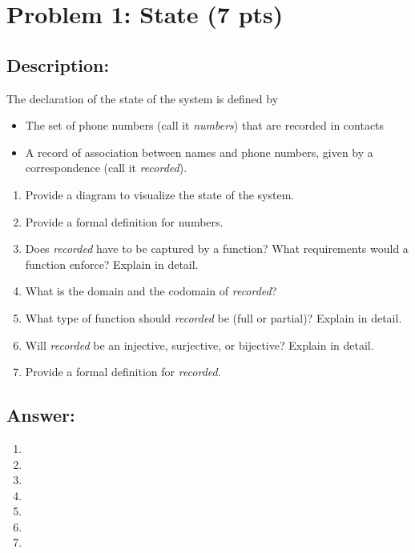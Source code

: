 \newpage
\section{Problem 1: State (7 pts)}

\subsection{Description:}

The declaration of the state of the system is defined by

\begin{itemize}
    \item The set of phone numbers (call it \textit{numbers}) that are recorded in contacts
    \item A record of association between names and phone numbers, given by a correspondence
        (call it \textit{recorded}).
\end{itemize}

\begin{enumerate}
    \item Provide a diagram to visualize the state of the system.
    \item Provide a formal definition for numbers.
    \item Does \textit{recorded} have to be captured by a function? What requirements would a function
enforce? Explain in detail.
    \item What is the domain and the codomain of \textit{recorded}?
    \item What type of function should \textit{recorded} be (full or partial)? Explain in detail.
    \item Will \textit{recorded} be an injective, surjective, or bijective? Explain in detail.
    \item Provide a formal definition for \textit{recorded}.
\end{enumerate}

\subsection{Answer:}

\begin{enumerate}
    \item
    \item
    \item
    \item
    \item
    \item
    \item
\end{enumerate}

